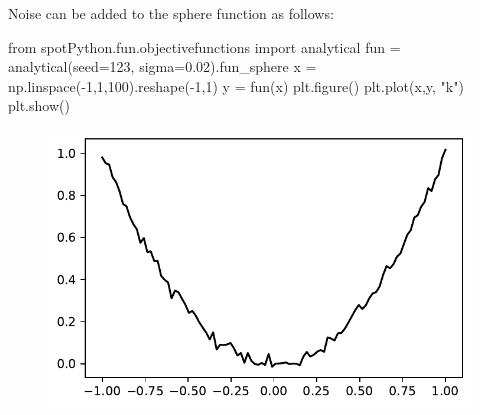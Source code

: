 \documentclass[
  letterpaper,
  DIV=11,
  numbers=noendperiod]{scrreprt}
\newenvironment{Shaded}{\begin{snugshade}}{\end{snugshade}}
\newcommand{\DecValTok}[1]{\textcolor[rgb]{0.68,0.00,0.00}{#1}}
\newcommand{\FloatTok}[1]{\textcolor[rgb]{0.68,0.00,0.00}{#1}}
\newcommand{\ImportTok}[1]{\textcolor[rgb]{0.00,0.46,0.62}{#1}}
\newcommand{\NormalTok}[1]{\textcolor[rgb]{0.00,0.23,0.31}{#1}}
\newcommand{\OperatorTok}[1]{\textcolor[rgb]{0.37,0.37,0.37}{#1}}
\newcommand{\StringTok}[1]{\textcolor[rgb]{0.13,0.47,0.30}{#1}}
\begin{document}
\begin{tcolorbox}[enhanced jigsaw, arc=.35mm, colback=white, bottomtitle=1mm, toprule=.15mm, coltitle=black, titlerule=0mm, leftrule=.75mm, title=\textcolor{quarto-callout-note-color}{\faInfo}\hspace{0.5em}{Example: The sphere function with noise}, opacitybacktitle=0.6, breakable, colbacktitle=quarto-callout-note-color!10!white, opacityback=0, toptitle=1mm, rightrule=.15mm, left=2mm, colframe=quarto-callout-note-color-frame, bottomrule=.15mm]

Noise can be added to the sphere function as follows:

\begin{Shaded}
\begin{Highlighting}[]
\ImportTok{from}\NormalTok{ spotPython.fun.objectivefunctions }\ImportTok{import}\NormalTok{ analytical}
\NormalTok{fun }\OperatorTok{=}\NormalTok{ analytical(seed}\OperatorTok{=}\DecValTok{123}\NormalTok{, sigma}\OperatorTok{=}\FloatTok{0.02}\NormalTok{).fun\_sphere}
\NormalTok{x }\OperatorTok{=}\NormalTok{ np.linspace(}\OperatorTok{{-}}\DecValTok{1}\NormalTok{,}\DecValTok{1}\NormalTok{,}\DecValTok{100}\NormalTok{).reshape(}\OperatorTok{{-}}\DecValTok{1}\NormalTok{,}\DecValTok{1}\NormalTok{)}
\NormalTok{y }\OperatorTok{=}\NormalTok{ fun(x)}
\NormalTok{plt.figure()}
\NormalTok{plt.plot(x,y, }\StringTok{"k"}\NormalTok{)}
\NormalTok{plt.show()}
\end{Highlighting}
\end{Shaded}

\begin{figure}[H]

{\centering \includegraphics{013_num_spot_noisy_files/figure-pdf/cell-4-output-1.pdf}

}

\end{figure}

\end{tcolorbox}
\end{document}
